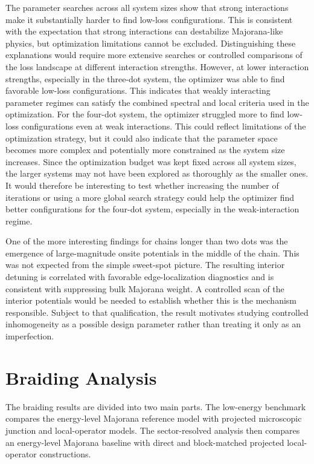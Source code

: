 The parameter searches across all system sizes show that strong interactions make it substantially harder to find low-loss configurations. This is consistent with the expectation that strong interactions can destabilize Majorana-like physics, but optimization limitations cannot be excluded. Distinguishing these explanations would require more extensive searches or controlled comparisons of the loss landscape at different interaction strengths.
However, at lower interaction strengths, especially in the three-dot system, the optimizer was able to find favorable low-loss configurations. This indicates that weakly interacting parameter regimes can satisfy the combined spectral and local criteria used in the optimization.
For the four-dot system, the optimizer struggled more to find low-loss configurations even at weak interactions. This could reflect limitations of the optimization strategy, but it could also indicate that the parameter space becomes more complex and potentially more constrained as the system size increases. Since the optimization budget was kept fixed across all system sizes, the larger systems may not have been explored as thoroughly as the smaller ones. It would therefore be interesting to test whether increasing the number of iterations or using a more global search strategy could help the optimizer find better configurations for the four-dot system, especially in the weak-interaction regime.

One of the more interesting findings for chains longer than two dots was the emergence of large-magnitude onsite potentials in the middle of the chain. This was not expected from the simple sweet-spot picture. The resulting interior detuning is correlated with favorable edge-localization diagnostics and is consistent with suppressing bulk Majorana weight. A controlled scan of the interior potentials would be needed to establish whether this is the mechanism responsible. Subject to that qualification, the result motivates studying controlled inhomogeneity as a possible design parameter rather than treating it only as an imperfection.

\section{Braiding Analysis}
The braiding results are divided into two main parts. The low-energy benchmark compares the energy-level Majorana reference model with projected microscopic junction and local-operator models. The sector-resolved analysis then compares an energy-level Majorana baseline with direct and block-matched projected local-operator constructions.

